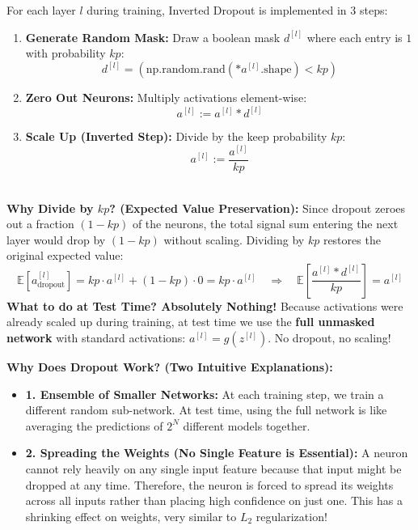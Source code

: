 \documentclass[10pt,a4paper]{article}
\begin{document}
\begin{tcolorbox}[
    colframe=themeblue, colback=lightbg, coltitle=white,
    fonttitle=\bfseries\sffamily\small,
    title={Implementation: Inverted Dropout (3 Simple Steps)},
    arc=1.3mm, boxrule=0.5pt, left=5pt, right=5pt, top=2pt, bottom=2pt
]
\footnotesize
For each layer $l$ during training, Inverted Dropout is implemented in 3 steps:
\begin{enumerate}[leftmargin=12pt, itemsep=1.5pt, topsep=1pt]
    \item \textbf{Generate Random Mask:} Draw a boolean mask $d^{[l]}$ where each entry is $1$ with probability $kp$:
    \[
    d^{[l]} = (\text{np.random.rand}(*a^{[l]}\text{.shape}) < kp)
    \]
    \item \textbf{Zero Out Neurons:} Multiply activations element-wise:
    \[
    a^{[l]} := a^{[l]} * d^{[l]}
    \]
    \item \textbf{Scale Up (Inverted Step):} Divide by the keep probability $kp$:
    \[
    a^{[l]} := \frac{a^{[l]}}{kp}
    \]
\end{enumerate}
\hrulefill\\[1pt]
\textbf{Why Divide by $kp$? (Expected Value Preservation):}
Since dropout zeroes out a fraction $(1 - kp)$ of the neurons, the total signal sum entering the next layer would drop by $(1 - kp)$ without scaling. Dividing by $kp$ restores the original expected value:
\[
\mathbb{E}[a^{[l]}_{\text{dropout}}] = kp \cdot a^{[l]} + (1 - kp) \cdot 0 = kp \cdot a^{[l]} \quad\Longrightarrow\quad \mathbb{E}\left[\frac{a^{[l]} * d^{[l]}}{kp}\right] = a^{[l]}
\]
\textbf{What to do at Test Time? Absolutely Nothing!}
Because activations were already scaled up during training, at test time we use the \textbf{full unmasked network} with standard activations: $a^{[l]} = g(z^{[l]})$. No dropout, no scaling!
\end{tcolorbox}

\vspace{-2pt}

\begin{tcolorbox}[
    colframe=accentred, colback=white, arc=1.3mm, boxrule=0.5pt,
    left=5pt, right=5pt, top=2pt, bottom=2pt
]
\footnotesize
\textbf{Why Does Dropout Work? (Two Intuitive Explanations):}
\begin{itemize}[leftmargin=8pt, itemsep=1pt, topsep=0pt]
    \item \textbf{1. Ensemble of Smaller Networks:} At each training step, we train a different random sub-network. At test time, using the full network is like averaging the predictions of $2^N$ different models together.
    \item \textbf{2. Spreading the Weights (No Single Feature is Essential):} A neuron cannot rely heavily on any single input feature because that input might be dropped at any time. Therefore, the neuron is forced to spread its weights across all inputs rather than placing high confidence on just one. This has a shrinking effect on weights, very similar to $L_2$ regularization!
\end{itemize}
\end{tcolorbox}
\end{document}
